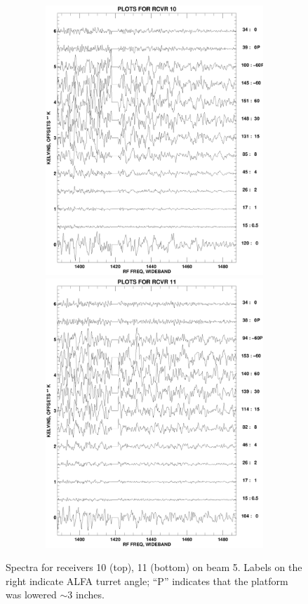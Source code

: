 \documentclass[psfig,preprint]{aastex}
\begin{document}
\begin{figure}[!p]
\begin{center}
\includegraphics[width=6in, height=4in]{rcvrplot10.ps}   
\includegraphics[width=6in, height=4in]{rcvrplot11.ps}   
\end{center}
\caption{Spectra for receivers 10 (top), 11 (bottom) on beam 5. Labels on the right
indicate ALFA turret angle; ``P'' indicates that the platform was
lowered $\sim 3$ inches. \label{rcvr1011}}
\end{figure}
\end{document}
